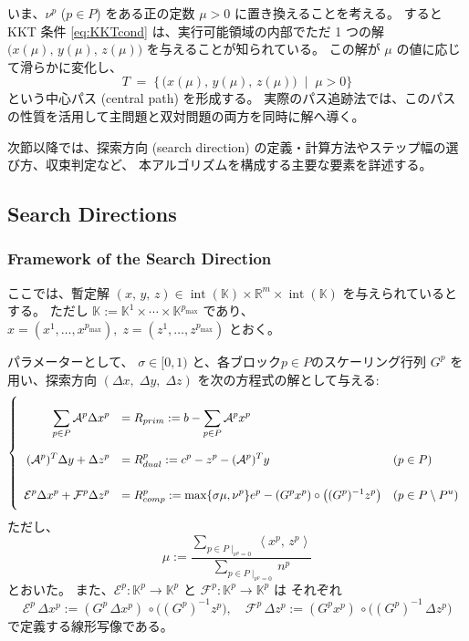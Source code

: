 \documentclass{jsarticle}
\newcommand{\inprod}[2]{\left\langle #1, \, #2 \right\rangle}
\begin{document}
いま、$\nu^p$ ($p \in P$) をある正の定数 $\mu>0$ に置き換えることを考える。
すると KKT 条件 \eqref{eq:KKTcond} は、実行可能領域の内部でただ 1 つの解 $\bigl(x(\mu),\,y(\mu),\,z(\mu)\bigr)$ を与えることが知られている。
この解が $\mu$ の値に応じて滑らかに変化し、
\[
  T \;=\; \bigl\{\,\bigl(x(\mu),\,y(\mu),\,z(\mu)\bigr) \;\mid\; \mu>0 \bigr\}
\]
という中心パス (central path) を形成する。
実際のパス追跡法では、このパスの性質を活用して主問題と双対問題の両方を同時に解へ導く。

\medskip

次節以降では、探索方向 (search direction) の定義・計算方法やステップ幅の選び方、収束判定など、
本アルゴリズムを構成する主要な要素を詳述する。


\bigskip
\subsection{Search Directions} \label{sec:direction}

\subsubsection{Framework of the Search Direction}

ここでは、暫定解 $(x,\,y,\,z)\in \operatorname{int}(\mathbb{K})\times \mathbb{R}^m \times \operatorname{int}(\mathbb{K})$ を与えられているとする。
ただし $\mathbb{K} := \mathbb{K}^1\times\cdots\times \mathbb{K}^{p_{\max}}$ であり、
$x=(x^1,\ldots,x^{p_{\max}}),\;z=(z^1,\ldots,z^{p_{\max}})$ とおく。

パラメーターとして、 $\sigma \in [0,1)$ と、各ブロック$p\in P$のスケーリング行列 $G^p$ を用い、探索方向 $(\Delta x,\;\Delta y,\;\Delta z)$ を次の方程式の解として与える:
\begin{equation}
    \everymath{\displaystyle}
    \renewcommand{\arraystretch}{2.5}
    \left\{
    \begin{array}{rll}
         \sum_{p\in P} \mathcal{A}^p \Delta x^p & = R_{prim} := b - \sum_{p\in P} \mathcal{A}^p x^p &  \\
         (\mathcal{A}^p)^T \Delta y + \Delta z^p & = R_{dual}^p := c^p - z^p -  (\mathcal{A}^p)^T y 
 & (p\in P) \\
         \mathcal{E}^p \Delta x^p + \mathcal{F}^p \Delta z^p & = R_{comp}^p := \max\{\sigma\mu, \nu^p\} e^p - (G^p x^p)\circ \bigl((G^p)^{-1} z^p\bigr) & (p\in P\setminus P^u)
    \end{array}
    \right.
    \label{eq:NewtonKKT}
\end{equation}
ただし、
\begin{equation}
  \mu := \frac{\sum_{p\in P \mid_{\nu^p=0}}\inprod{x^p}{z^p}}
              {\sum_{p\in P \mid_{\nu^p=0}} n^p}
  \label{eq:mu}
\end{equation}
とおいた。
また、$\mathcal{E}^p : \mathbb{K}^p \to \mathbb{K}^p$ と $\mathcal{F}^p : \mathbb{K}^p \to \mathbb{K}^p$ は
それぞれ
\[
  \mathcal{E}^p\,\Delta x^p
    := (G^p \,\Delta x^p)\,\circ\bigl((G^p)^{-1} z^p\bigr),
  \quad
  \mathcal{F}^p\,\Delta z^p
    := (G^p x^p)\,\circ\bigl((G^p)^{-1}\,\Delta z^p\bigr)
\]
で定義する線形写像である。 %
\end{document}
